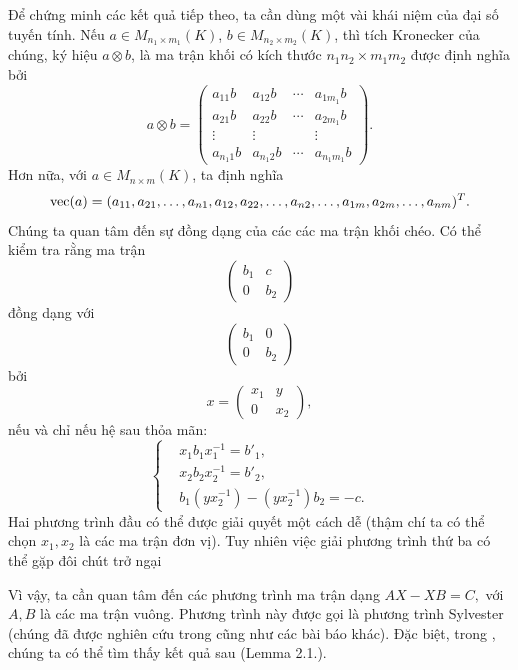 Để chứng minh các kết quả tiếp theo, ta cần dùng một vài khái niệm của đại số tuyến tính. Nếu \(a \in M_{n_1 \times m_1}(K)\), \(b \in M_{n_2 \times m_2}(K)\), thì tích Kronecker của chúng, ký hiệu \(a \otimes b\), là ma trận khối có kích thước \(n_1 n_2 \times m_1 m_2\) được định nghĩa bởi
\[
a \otimes b =
\begin{pmatrix}
a_{11} b & a_{12} b & \cdots & a_{1m_1} b \\
a_{21} b & a_{22} b & \cdots & a_{2m_1} b \\
\vdots   & \vdots   &        & \vdots \\
a_{n_1 1} b & a_{n_1 2} b & \cdots & a_{n_1 m_1} b
\end{pmatrix}.
\]
Hơn nữa, với \(a \in M_{n \times m}(K)\), ta định nghĩa
\[
{\rm vec}(a) = (a_{11}, a_{21}, \ldots, a_{n1}, a_{12}, a_{22}, \ldots, a_{n2}, \ldots, a_{1m}, a_{2m}, \ldots, a_{nm})^{T}.
\]
Chúng ta quan tâm đến sự đồng dạng của các các ma trận khối chéo. Có thể kiểm tra rằng ma trận
\[
\begin{pmatrix}
b_1 & c \\
0   & b_2
\end{pmatrix}
\]
đồng dạng với
\[
\begin{pmatrix}
b_1 & 0 \\
0   & b_2
\end{pmatrix}
\]
bởi
\[
x = \begin{pmatrix}
x_1 & y \\
0   & x_2
\end{pmatrix},
\]
nếu và chỉ nếu hệ sau thỏa mãn:
\begin{equation}\label{eq:hekhoidongdang}
\left\{\begin{aligned}
&x_1 b_1 x_1^{-1} = b'_1, \\
&x_2 b_2 x_2^{-1} = b'_2, \\
&b_1 (yx_2^{-1}) - (yx_2^{-1}) b_2 = -c.
\end{aligned}\right.
\end{equation}
Hai phương trình đầu có thể được giải quyết một cách dễ (thậm chí ta có thể chọn \(x_1, x_2\) là các ma trận đơn vị). Tuy nhiên việc giải phương trình thứ ba có thể gặp đôi chút trở ngại

Vì vậy, ta cần quan tâm đến các phương trình ma trận dạng \(A X - X B = C,\) với $A,B$ là các ma trận vuông. Phương trình này được gọi là phương trình Sylvester (chúng đã được nghiên cứu trong \cite{JiangWei2003,LancasterTismenetsky1985,Roth1952} cũng như các bài báo khác). Đặc biệt, trong \cite{JiangWei2003}, chúng ta có thể tìm thấy kết quả sau (Lemma 2.1.).


